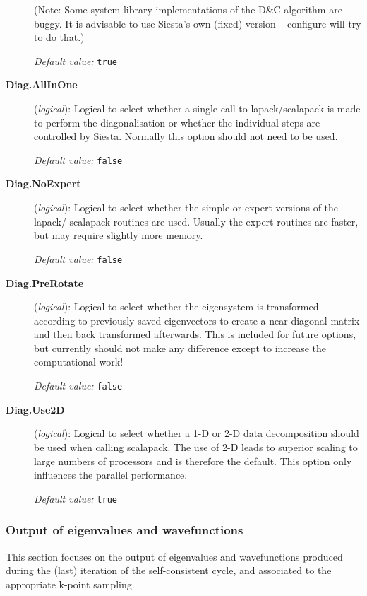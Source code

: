 \documentclass[11pt]{article}
\begin{document}
\begin{description}
(Note: Some system library implementations of the D\&C algorithm are
buggy. It is advisable to use Siesta's own (fixed) version -- configure will
try to do that.)

{\it Default value:} {\tt true}

\item[{\bf Diag.AllInOne}] ({\it logical}):
Logical to select whether a single call to lapack/scalapack is made to
perform the diagonalisation or whether the individual steps are controlled
by {\sc Siesta}. Normally this option should not need to be used.

{\it Default value:} {\tt false}

\item[{\bf Diag.NoExpert}] ({\it logical}):
Logical to select whether the simple or expert versions of the lapack/
scalapack routines are used. Usually the expert routines are faster, but
may require slightly more memory.

{\it Default value:} {\tt false}

\item[{\bf Diag.PreRotate}] ({\it logical}):
Logical to select whether the eigensystem is transformed according to
previously saved eigenvectors to create a near diagonal matrix and then
back transformed afterwards. This is included for future options, but
currently should not make any difference except to increase the
computational work!

{\it Default value:} {\tt false}

\item[{\bf Diag.Use2D}] ({\it logical}):
Logical to select whether a 1-D or 2-D data decomposition should be used
when calling scalapack. The use of 2-D leads to superior scaling to
large numbers of processors and is therefore the default. This option
only influences the parallel performance.

{\it Default value:} {\tt true}

\end{description}

\subsubsection{Output of eigenvalues and wavefunctions}

This section focuses on the output of eigenvalues and wavefunctions
produced during the (last) iteration of the self-consistent cycle,
and associated to the appropriate k-point sampling.
\end{document}
